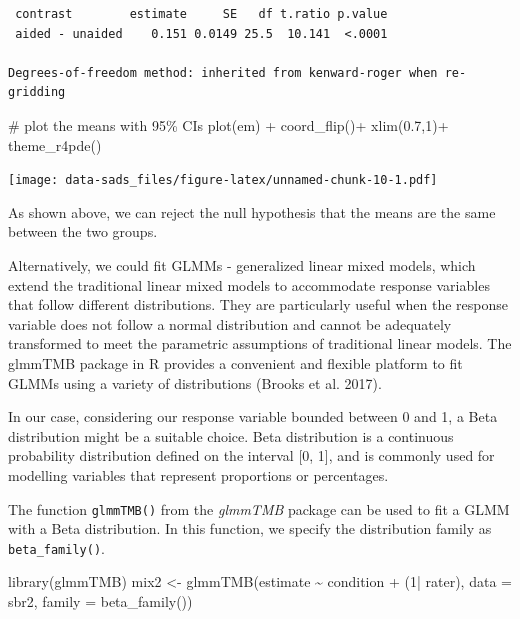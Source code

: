 \documentclass[
  letterpaper,
]{book}
\newenvironment{Shaded}{\begin{snugshade}}{\end{snugshade}}
\newcommand{\AttributeTok}[1]{\textcolor[rgb]{0.40,0.45,0.13}{#1}}
\newcommand{\CommentTok}[1]{\textcolor[rgb]{0.37,0.37,0.37}{#1}}
\newcommand{\DecValTok}[1]{\textcolor[rgb]{0.68,0.00,0.00}{#1}}
\newcommand{\FloatTok}[1]{\textcolor[rgb]{0.68,0.00,0.00}{#1}}
\newcommand{\FunctionTok}[1]{\textcolor[rgb]{0.28,0.35,0.67}{#1}}
\newcommand{\NormalTok}[1]{\textcolor[rgb]{0.00,0.23,0.31}{#1}}
\newcommand{\OtherTok}[1]{\textcolor[rgb]{0.00,0.23,0.31}{#1}}
\newcommand{\SpecialCharTok}[1]{\textcolor[rgb]{0.37,0.37,0.37}{#1}}
\begin{document}
\begin{verbatim}
 contrast        estimate     SE   df t.ratio p.value
 aided - unaided    0.151 0.0149 25.5  10.141  <.0001

Degrees-of-freedom method: inherited from kenward-roger when re-gridding 
\end{verbatim}

\begin{Shaded}
\begin{Highlighting}[]
\CommentTok{\# plot the means with 95\% CIs}
\FunctionTok{plot}\NormalTok{(em) }\SpecialCharTok{+}
  \FunctionTok{coord\_flip}\NormalTok{()}\SpecialCharTok{+}
  \FunctionTok{xlim}\NormalTok{(}\FloatTok{0.7}\NormalTok{,}\DecValTok{1}\NormalTok{)}\SpecialCharTok{+}
  \FunctionTok{theme\_r4pde}\NormalTok{()}
\end{Highlighting}
\end{Shaded}

\texttt{[image: data-sads\_files/figure-latex/unnamed-chunk-10-1.pdf]}

As shown above, we can reject the null hypothesis that the means are the
same between the two groups.

Alternatively, we could fit GLMMs - generalized linear mixed models,
which extend the traditional linear mixed models to accommodate response
variables that follow different distributions. They are particularly
useful when the response variable does not follow a normal distribution
and cannot be adequately transformed to meet the parametric assumptions
of traditional linear models. The glmmTMB package in R provides a
convenient and flexible platform to fit GLMMs using a variety of
distributions (Brooks et al. 2017).

In our case, considering our response variable bounded between 0 and 1,
a Beta distribution might be a suitable choice. Beta distribution is a
continuous probability distribution defined on the interval {[}0, 1{]},
and is commonly used for modelling variables that represent proportions
or percentages.

The function \texttt{glmmTMB()} from the \emph{glmmTMB} package can be
used to fit a GLMM with a Beta distribution. In this function, we
specify the distribution family as \texttt{beta\_family()}.

\begin{Shaded}
\begin{Highlighting}[]
\FunctionTok{library}\NormalTok{(glmmTMB)}
\NormalTok{mix2 }\OtherTok{\textless{}{-}}  \FunctionTok{glmmTMB}\NormalTok{(estimate }\SpecialCharTok{\textasciitilde{}}\NormalTok{ condition }\SpecialCharTok{+}\NormalTok{ (}\DecValTok{1}\SpecialCharTok{|}\NormalTok{ rater), }
                 \AttributeTok{data =}\NormalTok{ sbr2, }
                 \AttributeTok{family =} \FunctionTok{beta\_family}\NormalTok{())}
\end{Highlighting}
\end{Shaded}
\end{document}
